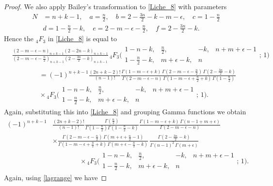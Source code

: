 \documentclass{article}
\theoremstyle{boldremark}
\renewcommand\[{\begin{equation}}
\renewcommand\]{\end{equation}}
\theoremstyle{definition}
\numberwithin{equation}{section}
\begin{document}
\begin{proof}
We also apply Bailey's transformation to  \eqref{Liche_8} with parameters
\begin{align*}
    N &= n + k - 1, \quad a = \frac{n}{2}, \quad b = 2 - \frac{3n}{2} - k - m - \epsilon, \quad c = 1 - \frac{n}{2} \\
    &d = 1 - \frac{n}{2} - k, \quad e = 2 - m - \epsilon - \frac{n}{2}, \quad f = 2 - \frac{3n}{2} - k.
\end{align*}
Hence the $_4F_3$ in \eqref{Liche_8} is equal to 
\begin{align*}
&\frac{\left(2-m-\epsilon-n\right)_{n+k-1} \left(2-2n-k\right)_{n+k-1}}{\left(2-m-\epsilon-\frac{n}{2}\right)_{n+k-1} \left(2-\frac{3n}{2}-k\right)_{n+k-1}} 
\,{}_4F_3\Biggl( 
\begin{matrix} 
1-n-k, & \frac{n}{2}, & -k, & n+m+\epsilon-1 \\[4 pt]
1-\frac{n}{2}-k, & m+\epsilon-k, & n 
\end{matrix} 
;\, 1 \Biggr)\\
& \qquad \qquad = (-1)^{n+k-1}\frac{(2n+k-2)!}{(n-1)!}\frac{\Gamma(1-m-\epsilon+k) \, \Gamma\left(2-m-\epsilon-\frac{n}{2}\right) \, \Gamma\left(2-\frac{3n}{2}-k\right)}{\Gamma(2-m-\epsilon-n) \, \Gamma\left(1-m-\epsilon+\frac{n}{2}+k\right) \, \Gamma\left(1-\frac{n}{2}\right)}\\&\qquad \qquad \times {}_4F_3\Biggl( 
\begin{matrix} 
1-n-k, & \frac{n}{2}, & -k, & n+m+\epsilon-1 \\[4 pt]
1-\frac{n}{2}-k, & m+\epsilon-k, & n 
\end{matrix} 
;\, 1 \Biggr).
\end{align*}
Again, substituting this into \eqref{Liche_8} and grouping Gamma functions we obtain 
\begin{align*}
    (-1)^{n+k-1}&\frac{(2n+k-2)!}{(n-1)!} \frac{\Gamma\!\left(\frac n2\right)}
{\Gamma\!\left(1-\frac n2\right)\Gamma\!\left(1-\frac n2-k\right)} \frac{\Gamma(1-m-\epsilon + k)\,\Gamma(n-1+m+\epsilon)}{\Gamma(2-m-\epsilon - n)} \\
    & \times \frac{\Gamma(2-m-\epsilon - \frac{n}{2})\, \Gamma(m+\epsilon + \frac{n}{2} - 1)}{\Gamma(1-m-\epsilon + \frac{n}{2} +k)\, \Gamma(m+\epsilon - \frac{n}{2} -k)}\,\frac{\Gamma(2 - \frac{3n}{2} - k)}{\Gamma(n-1)^2\, \Gamma(m+\epsilon)} \\ &\qquad \qquad \times {}_4F_3\Biggl( 
\begin{matrix} 
1-n-k, & \frac{n}{2}, & -k, & n+m+\epsilon-1 \\ 
1-\frac{n}{2}-k, & m+\epsilon-k, & n 
\end{matrix} 
;\, 1 \Biggr).
\end{align*}
Again, using \eqref{lagrange} we have


\end{proof}
\end{document}
